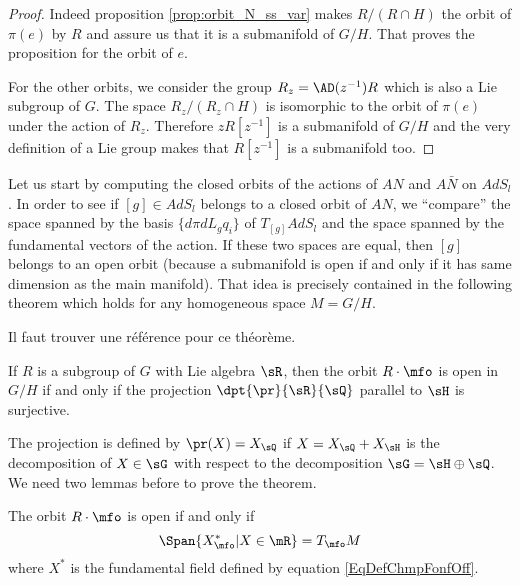 \begin{proof}
 Indeed proposition \ref{prop:orbit_N_ss_var} makes $R/(R\cap H)$ the orbit of $\pi(e)$ by $R$ and assure us that it is a submanifold of $G/H$. That proves the proposition for the orbit of $e$. 

For the other orbits, we consider the group $R_z=\AD(z^{-1})R$ which is also a Lie  subgroup of $G$. The space $R_z/(R_z\cap H)$ is isomorphic to the orbit of $\pi(e)$ under the action of $R_z$. Therefore $zR[z^{-1}]$ is a submanifold of $G/H$ and the very definition of a Lie group makes that  $R[z^{-1}]$ is a submanifold too.

\end{proof}

Let us start by computing the closed orbits of the actions of $AN$ and $A\bar{N}$ on $AdS_l$. In order to see if $[g]\in AdS_l$ belongs to a closed orbit of $AN$, we ``compare'' the space spanned by the basis $\{d\pi dL_g q_i\}$ of $T_{[g]}AdS_l$ and the space spanned by the fundamental vectors of the action. If these two spaces are equal, then $[g]$ belongs to an open orbit (because a submanifold is open if and only if it has same dimension as the main manifold). That idea is precisely contained in the following theorem which holds for any homogeneous space $M=G/H$.

\begin{probleme}
Il faut trouver une référence pour ce théorème.
\end{probleme}


\begin{theorem}
If $R$ is a subgroup of $G$ with Lie algebra $\sR$, then the orbit $R\cdot \mfo$ is open in $G/H$ if and only if the projection $\dpt{\pr}{\sR}{\sQ}$ parallel to $\sH$ is surjective.
\label{tho:pr_ouvert}
\end{theorem}

The projection is defined by $\pr(X)=X_{\sQ}$ if $X=X_{\sQ}+X_{\sH}$ is the decomposition of $X\in\sG$ with respect to the decomposition $\sG=\sH\oplus\sQ$. We need two lemmas before to prove the theorem.

\begin{lemma}
The orbit $R\cdot\mfo$ is open if and only if
\[
    \Span\{X^*_{\mfo}|X\in\mR\}=T_{\mfo}M
\]
where $X^*$ is the fundamental field defined by equation \eqref{EqDefChmpFonfOff}.
\label{lem:equiv_1}
\end{lemma}

